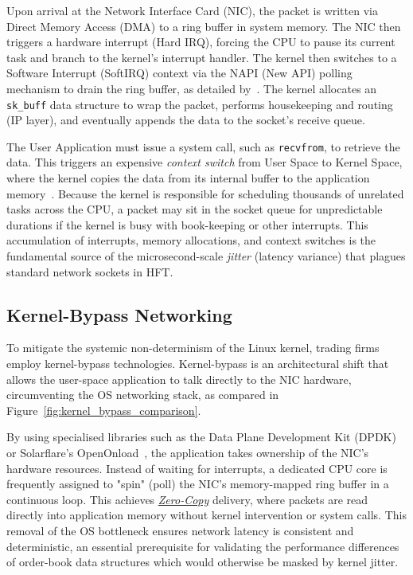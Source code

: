 

Upon arrival at the Network Interface Card (NIC), the packet is 
written via Direct Memory Access (DMA) to a ring buffer in system memory. 
The NIC then triggers a hardware interrupt (Hard IRQ), forcing the 
CPU to pause its current task and branch to the kernel's interrupt 
handler. 
The kernel then switches to a Software Interrupt (SoftIRQ) 
context via the NAPI (New API) polling mechanism to drain the ring 
buffer, as detailed by~\citet{love_kernel, benvenuti_networking}. 
The kernel allocates an \texttt{sk\_buff} data structure 
to wrap the packet, performs housekeeping and routing (IP layer), 
and eventually appends the data to the socket's receive queue.

The User Application must issue a system call, such as 
\texttt{recvfrom}, to retrieve the data. This triggers an 
expensive \textit{context switch} from User Space to Kernel Space, 
where the kernel copies the data from its internal buffer to the 
application memory~\citep{benvenuti_networking, cai2021overhead}. 
Because the kernel is responsible for scheduling thousands of unrelated 
tasks across the CPU, a packet may sit in the socket queue for 
unpredictable durations if the kernel is busy with book-keeping or 
other interrupts. 
This accumulation of interrupts, memory allocations, and context 
switches is the fundamental source of the microsecond-scale 
\textit{jitter} (latency variance) that plagues standard network 
sockets in HFT.

\subsection{Kernel-Bypass Networking}
To mitigate the systemic non-determinism of the Linux kernel, 
trading firms employ kernel-bypass technologies. 
Kernel-bypass is an architectural shift that allows the user-space 
application to talk directly to the NIC hardware, circumventing 
the OS networking stack, as compared in 
Figure~\ref{fig:kernel_bypass_comparison}.



By using specialised libraries such as the Data Plane Development 
Kit (DPDK) or Solarflare's OpenOnload~\citep{redhat2012_openonload}, 
the application takes ownership of the NIC's hardware 
resources. 
Instead of waiting for interrupts, a dedicated CPU core is 
frequently assigned to "spin" (poll) the NIC's memory-mapped 
ring buffer in a continuous loop. 
This achieves \hyperref[app:glossary]{\textit{Zero-Copy}} delivery, where packets are read 
directly into application memory without kernel intervention or 
system calls. 
This removal of the OS bottleneck ensures network latency is 
consistent and deterministic, an essential prerequisite for 
validating the performance differences of 
order-book data structures which would otherwise be masked by 
kernel jitter.

